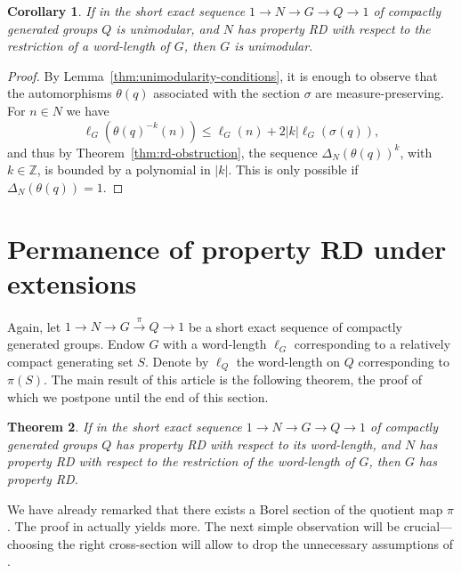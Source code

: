 \documentclass{amsart}
\newtheorem{theorem}{Theorem}[section]
\newtheorem{corollary}[theorem]{Corollary}
\theoremstyle{definition}
\theoremstyle{remark}
\begin{document}
\begin{corollary}
  \label{thm:unimodularity-extension}
  If in the short exact sequence $1\to N\to G \to Q\to 1$ of compactly
  generated groups $Q$ is unimodular, and $N$ has property RD with respect to the
  restriction of a word-length of $G$, then $G$ is unimodular.
\end{corollary}

\begin{proof}
  By Lemma~\ref{thm:unimodularity-conditions}, it is enough to observe
  that the automorphisms $\theta(q)$ associated with the section
  $\sigma$ are measure-preserving. For $n\in N$ we have
  \begin{equation}
    \ell_G(\theta(q)^{-k}(n)) \leq \ell_G(n) + 2{\left\lvert{k}\right\rvert} \ell_G(\sigma(q)),
  \end{equation}
  and thus by Theorem~\ref{thm:rd-obstruction}, the sequence
  $\Delta_N(\theta(q))^k$, with $k\in{\mathbb{Z}}$, is bounded by a polynomial
  in ${\left\lvert{k}\right\rvert}$. This is only possible if $\Delta_N(\theta(q))=1$.
\end{proof}

\section{Permanence of property RD under extensions}
\label{sec:permanence}

Again, let $1\to N\to G\overset{\pi}{\to} Q\to 1$ be a short exact
sequence of compactly generated groups. Endow $G$ with a word-length
$\ell_G$ corresponding to a relatively compact generating set
$S$. Denote by $\ell_Q$ the word-length on $Q$ corresponding to
$\pi(S)$. The main result of this article is the following theorem,
the proof of which we postpone until the end of this section.

\begin{theorem}
  \label{thm:main-thm}
  If in the short exact sequence $1\to N\to G \to Q\to 1$ of
  compactly generated groups $Q$ has property RD with respect to its
  word-length, and $N$ has property RD with respect to the restriction
  of the word-length of $G$, then $G$ has property RD.
\end{theorem}

We have already remarked that there exists a Borel section
of the quotient map $\pi$. The proof in \cite{Mackey1952} actually
yields more. The next simple observation will be crucial---choosing
the right cross-section will allow to drop the unnecessary assumptions
of \cite[Proposition 2.1.9]{Jolissaint1990}.
\end{document}
